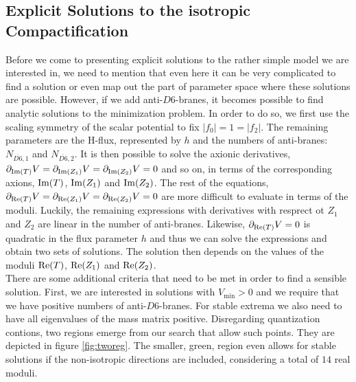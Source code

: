 \documentclass[a4paper,12pt,twoside,openright]{report}
\def\rmre{{\rm Re}}
\def\rmim{{\rm Im}}
\begin{document}
\subsection{Explicit Solutions to the isotropic Compactification}
Before we come to presenting explicit solutions to the rather simple model we are interested in, we need to mention that even here it can be very complicated to find a solution or even map out the part of parameter space where these solutions are possible. However, if we add anti-$D6$-branes, it becomes possible to find analytic solutions to the minimization problem. In order to do so, we first use the scaling symmetry of the scalar potential to fix $|f_0| = 1 = |f_2|$. The remaining parameters are the H-flux, represented by $h$ and the numbers of anti-branes: $N_{\overline{D6},1}$ and $N_{\overline{D6},2}$. It is then possible to solve the axionic derivatives, $\partial_{\rmim(T)} V = \partial_{\rmim(Z_1)} V = \partial_{\rmim(Z_2)} V= 0$ and so on, in terms of the corresponding axions, $\rmim(T)$, $\rmim(Z_1)$ and $\rmim(Z_2)$. The rest of the equations, $\partial_{\rmre(T)} V = \partial_{\rmre(Z_1)} V = \partial_{\rmre(Z_2)} V=0$ are more difficult to evaluate in terms of the moduli. Luckily, the remaining expressions with derivatives with resprect ot $Z_1$ and $Z_2$ are linear in the number of anti-branes. Likewise, $\partial_{\rmre(T)} V = 0$ is quadratic in the flux parameter $h$ and thus we can solve the expressions and obtain two sets of solutions. The solution then depends on the values of the moduli $\rmre(T)$, $\rmre(Z_1)$ and $\rmre(Z_2)$.\\
There are some additional criteria that need to be met in order to find a sensible solution. First, we are interested in solutions with $V_{\text{min}} >0$ and we require that we have positive numbers of anti-$D6$-branes. For stable extrema we also need to have all eigenvalues of the mass matrix positive. Disregarding quantization contions, two regions emerge from our search that allow such points. They are depicted in figure \ref{fig:tworeg}. The smaller, green, region even allows for stable solutions if the non-isotropic directions are included, considering a total of $14$ real moduli.
\end{document}
